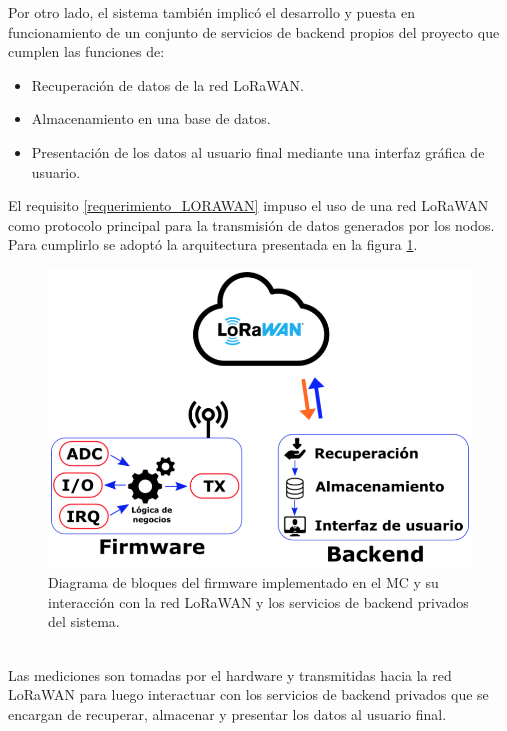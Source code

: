 Por otro lado, el sistema también implicó el desarrollo y puesta en funcionamiento de un conjunto de servicios de backend propios del proyecto que cumplen las funciones de:
\begin{itemize}
	\item Recuperación de datos de la red LoRaWAN.
	\item Almacenamiento en una base de datos.
	\item Presentación de los datos al usuario final mediante una interfaz gráfica de usuario.
\end{itemize}

El requisito \ref{requerimiento_LORAWAN} impuso el uso de una red LoRaWAN como protocolo principal para la transmisión de datos generados por los nodos. Para cumplirlo se adoptó la arquitectura presentada en la figura \ref{fig:diagramadebloquesdebes}.\\
\begin{figure}[h!]
	\centering
	\includegraphics[width=0.8\linewidth]{Figures/diagrama_de_bloques_de_BES}
	\caption{Diagrama de bloques del firmware implementado en el MC y su interacción con la red LoRaWAN y los servicios de backend privados del sistema.}
	\label{fig:diagramadebloquesdebes}
\end{figure}\\
Las mediciones son tomadas por el hardware y transmitidas hacia la red LoRaWAN para luego interactuar con los servicios de backend privados que se encargan de recuperar, almacenar y presentar los datos al usuario final.\\

